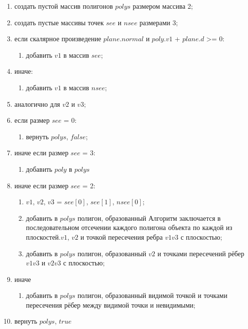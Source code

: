 \begin{enumerate}
	\item создать пустой массив полигонов $polys$ размером массива 2;
	\item создать пустые массивы точек $see$ и $nsee$ размерами 3;
	\item если скалярное произведение $plane.normal$ и $poly.v1$ + $plane.d$ >= 0:
	\begin{enumerate}
		\item добавить $v1$ в массив $see$;
	\end{enumerate}
	\item иначе:
	\begin{enumerate}
		\item добавить $v1$ в массив $nsee$;
	\end{enumerate}
	\item аналогично для $v2$ и $v3$;
	
	\item если размер $see$ = 0:
	\begin{enumerate}
		\item вернуть $polys$, $false$;
	\end{enumerate}
	\item иначе если размер $see$ = 3:
	\begin{enumerate}
		\item добавить $poly$ в $polys$
	\end{enumerate}
	\item иначе если размер $see$ = 2:
	\begin{enumerate}
		\item $v1$, $v2$, $v3$ = $see[0]$, $see[1]$, $nsee[0]$;
		\item добавить в $polys$ полигон, образованный Алгоритм заключается в последовательном отсечении каждого полигона объекта по каждой из плоскостей.$v1$, $v2$ и точкой пересечения ребра $v1v3$ с плоскостью;
		\item добавить в $polys$ полигон, образованный $v2$ и точками пересечений рёбер $v1v3$ и $v2v3$ с плоскостью;
	\end{enumerate}
	\item иначе
	\begin{enumerate}
		\item добавить в $polys$ полигон, образованный видимой точкой и точками пересечения рёбер между видимой точки и невидимыми;
	\end{enumerate}
	\item вернуть $polys$, $true$
\end{enumerate}


